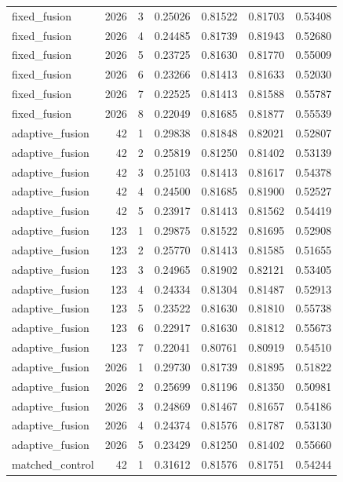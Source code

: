 \begin{tabular}{lrrrrrr}
fixed_fusion & 2026 & 3 & 0.25026 & 0.81522 & 0.81703 & 0.53408 \\
fixed_fusion & 2026 & 4 & 0.24485 & 0.81739 & 0.81943 & 0.52680 \\
fixed_fusion & 2026 & 5 & 0.23725 & 0.81630 & 0.81770 & 0.55009 \\
fixed_fusion & 2026 & 6 & 0.23266 & 0.81413 & 0.81633 & 0.52030 \\
fixed_fusion & 2026 & 7 & 0.22525 & 0.81413 & 0.81588 & 0.55787 \\
fixed_fusion & 2026 & 8 & 0.22049 & 0.81685 & 0.81877 & 0.55539 \\
adaptive_fusion & 42 & 1 & 0.29838 & 0.81848 & 0.82021 & 0.52807 \\
adaptive_fusion & 42 & 2 & 0.25819 & 0.81250 & 0.81402 & 0.53139 \\
adaptive_fusion & 42 & 3 & 0.25103 & 0.81413 & 0.81617 & 0.54378 \\
adaptive_fusion & 42 & 4 & 0.24500 & 0.81685 & 0.81900 & 0.52527 \\
adaptive_fusion & 42 & 5 & 0.23917 & 0.81413 & 0.81562 & 0.54419 \\
adaptive_fusion & 123 & 1 & 0.29875 & 0.81522 & 0.81695 & 0.52908 \\
adaptive_fusion & 123 & 2 & 0.25770 & 0.81413 & 0.81585 & 0.51655 \\
adaptive_fusion & 123 & 3 & 0.24965 & 0.81902 & 0.82121 & 0.53405 \\
adaptive_fusion & 123 & 4 & 0.24334 & 0.81304 & 0.81487 & 0.52913 \\
adaptive_fusion & 123 & 5 & 0.23522 & 0.81630 & 0.81810 & 0.55738 \\
adaptive_fusion & 123 & 6 & 0.22917 & 0.81630 & 0.81812 & 0.55673 \\
adaptive_fusion & 123 & 7 & 0.22041 & 0.80761 & 0.80919 & 0.54510 \\
adaptive_fusion & 2026 & 1 & 0.29730 & 0.81739 & 0.81895 & 0.51822 \\
adaptive_fusion & 2026 & 2 & 0.25699 & 0.81196 & 0.81350 & 0.50981 \\
adaptive_fusion & 2026 & 3 & 0.24869 & 0.81467 & 0.81657 & 0.54186 \\
adaptive_fusion & 2026 & 4 & 0.24374 & 0.81576 & 0.81787 & 0.53130 \\
adaptive_fusion & 2026 & 5 & 0.23429 & 0.81250 & 0.81402 & 0.55660 \\
matched_control & 42 & 1 & 0.31612 & 0.81576 & 0.81751 & 0.54244 \\

\end{tabular}
